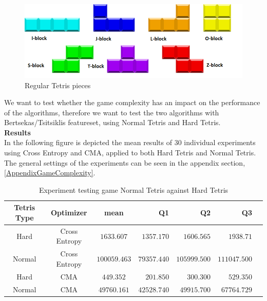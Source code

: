 \begin{figure}[H]
\begin{center}
\includegraphics[scale=0.6]{img/Pieces}
\end{center}
\caption{Regular Tetris pieces \label{fig:TetrisPieces}}
\end{figure}

We want to test whether the game complexity has an impact on the performance of the algorithms,
therefore we want to test the two algorithms with Bertsekas/Tsitsiklis featureset, using Normal Tetris and Hard Tetris.\\

\textbf{Results}\\
In the following figure is depicted the mean results of 30 individual experiments using Cross Entropy and CMA, applied to both Hard Tetris and Normal Tetris. The general settings of the experiments can be seen in the appendix section, \ref{AppendixGameComplexity}.

\begin{table}[H]
\centering
\small
\begin{tabular}{c c c r r r r}
Tetris Type & Optimizer & mean & Q1 & Q2 & Q3\\
\hline
Hard & Cross Entropy & $1633.607$ & $1357.170$ & $1606.565$ & $1938.71$\\
Normal & Cross Entropy & $100059.463$ & $79357.440$ & $105999.500$ & $111047.500$\\
Hard & CMA & $449.352$ & $201.850$ & $300.300$ & $529.350$\\
Normal & CMA & $49760.161$ & $42528.740$ & $49915.700$ & $67764.729$\\
\end{tabular}
\caption{Experiment testing game Normal Tetris against Hard Tetris}
\end{table}

